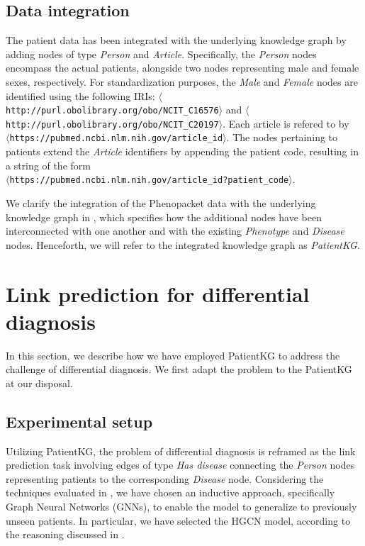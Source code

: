 \subsection{Data integration}
The patient data has been integrated with the underlying knowledge graph by adding nodes of type \emph{Person} and \emph{Article}. Specifically, the \emph{Person} nodes encompass the actual patients, alongside two nodes representing male and female sexes, respectively. For standardization purposes, the \emph{Male} and \emph{Female} nodes are identified using the following IRIs: \texttt{$\langle$http://purl.obolibrary.org/obo/NCIT\_C16576$\rangle$} and \texttt{$\langle$http://purl.obolibrary.org/obo/NCIT\_C20197$\rangle$}. Each article is refered to by \\ \texttt{$\langle$https://pubmed.ncbi.nlm.nih.gov/{article\_id}$\rangle$}. The nodes pertaining to patients extend the \emph{Article} identifiers by appending the patient code, resulting in a string of the form \\ \texttt{$\langle$https://pubmed.ncbi.nlm.nih.gov/{article\_id}?{patient\_code}$\rangle$}. 

We clarify the integration of the Phenopacket data with the underlying knowledge graph in , which specifies how the additional nodes have been interconnected with one another and with the existing \emph{Phenotype} and \emph{Disease} nodes. Henceforth, we will refer to the integrated knowledge graph as \emph{PatientKG}.


\section{Link prediction for differential diagnosis}\label{sec:linkPredictionDiffDiagnosis}
In this section, we describe how we have employed PatientKG to address the challenge of differential diagnosis. We first adapt the problem to the PatientKG at our disposal.

\subsection{Experimental setup}
Utilizing PatientKG, the problem of differential diagnosis is reframed as the link prediction task involving edges of type \emph{Has disease} connecting the \emph{Person} nodes representing patients to the corresponding \emph{Disease} node. Considering the techniques evaluated in , we have chosen an inductive approach, specifically Graph Neural Networks (GNNs), to enable the model to generalize to previously unseen patients. In particular, we have selected the HGCN model, according to the reasoning discussed in .

